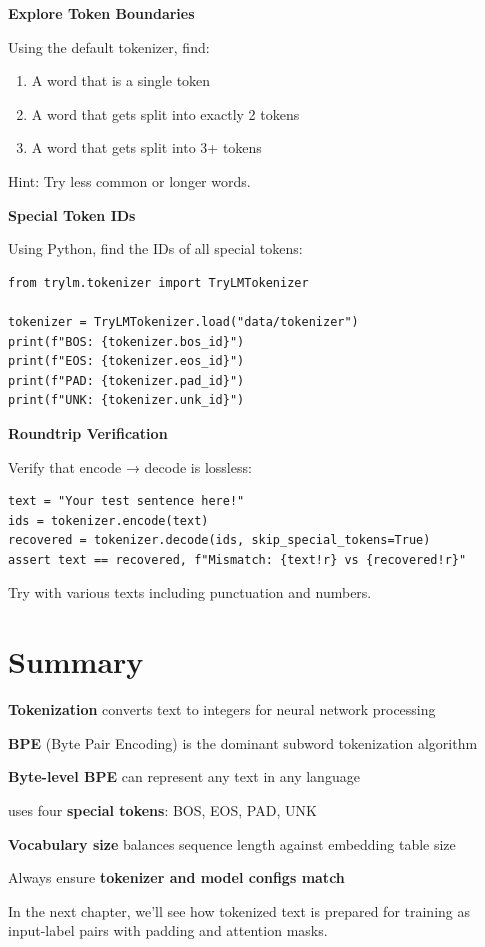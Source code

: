 \begin{exercise}
\textbf{Explore Token Boundaries}

Using the default tokenizer, find:
\begin{enumerate}
    \item A word that is a single token
    \item A word that gets split into exactly 2 tokens
    \item A word that gets split into 3+ tokens
\end{enumerate}

Hint: Try less common or longer words.
\end{exercise}

\begin{exercise}
\textbf{Special Token IDs}

Using Python, find the IDs of all special tokens:
\begin{lstlisting}[style=python]
from trylm.tokenizer import TryLMTokenizer

tokenizer = TryLMTokenizer.load("data/tokenizer")
print(f"BOS: {tokenizer.bos_id}")
print(f"EOS: {tokenizer.eos_id}")
print(f"PAD: {tokenizer.pad_id}")
print(f"UNK: {tokenizer.unk_id}")
\end{lstlisting}
\end{exercise}

\begin{exercise}
\textbf{Roundtrip Verification}

Verify that encode → decode is lossless:
\begin{lstlisting}[style=python]
text = "Your test sentence here!"
ids = tokenizer.encode(text)
recovered = tokenizer.decode(ids, skip_special_tokens=True)
assert text == recovered, f"Mismatch: {text!r} vs {recovered!r}"
\end{lstlisting}

Try with various texts including punctuation and numbers.
\end{exercise}

\section{Summary}

\begin{summary}
    \item \textbf{Tokenization} converts text to integers for neural network processing
    \item \textbf{BPE} (Byte Pair Encoding) is the dominant subword tokenization algorithm
    \item \textbf{Byte-level BPE} can represent any text in any language
    \item \TryLM uses four \textbf{special tokens}: BOS, EOS, PAD, UNK
    \item \textbf{Vocabulary size} balances sequence length against embedding table size
    \item Always ensure \textbf{tokenizer and model configs match}
\end{summary}

In the next chapter, we'll see how tokenized text is prepared for training as input-label pairs with padding and attention masks.
